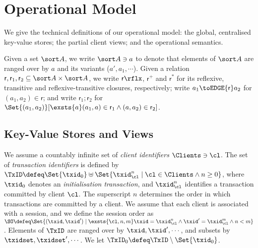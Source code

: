 \section{Operational Model}
\label{sec:model}

We give the technical definitions of our operational model: 
the global, centralised key-value stores; the partial client views;  and the
operational semantics. 

Given a set $\sort A$, we write $\sort A \ni a$ to denote that elements of $\sort A$ are ranged over by $a$ and its variants (\eg $a', a_1, \cdots$). 
Given a relation $\mathsf r, \mathsf r_1, \mathsf r_2 \subseteq \sort A \times \sort A$,
we write $\mathsf r\rflx$, $\mathsf r^+$ and $\mathsf r^*$ for its reflexive, transitive and reflexive-transitive closures, respectively;
write $a_1 \toEDGE{\mathsf r} a_2$ for $(a_1, a_2) \in \mathsf r$;
and write \( \mathsf r_1 ; \mathsf r_2\) for \( \Set{(a_1,a_2)}[\exsts{a} (a_1,a) \in \mathsf r_1 \land (a,a_2) \in \mathsf r_2]\).

\subsection{Key-Value Stores and Views}
\label{subsec:kvstores}
\label{sec:mkvs-view}
We assume a countably infinite set of \emph{client identifiers} $\Clients \ni \cl$. 
The set of \emph{transaction identifiers} is defined by
$\TxID \defeq  \Set{\txid_{0}} \uplus \Set{ \txid_{\cl}^{n} \mid \cl
  \in \Clients \land n \geq 0 }$, 
where  $\txid_0$ denotes  an \emph{initialisation transaction}, 
and $\txid_{\cl}^{n}$ identifies a transaction committed by client $\cl$. 
The superscript $n$ determines the order in which transactions 
are committed by a client. We assume that each client is associated with a session, 
and we define the session order as $\SO \defeq \Set{ (\txid, \txid') \mid \exsts{ \cl, n,m } \txid =
\txid_{\cl}^{n} \land \txid' = \txid_{\cl}^{m} \land n < m}$.
Elements of $\TxID$ are ranged over by
$\txid, \txid', \cdots$, and subsets by $\txidset, \txidset', \cdots$. 
We let $\TxID_{0} \defeq \TxID \setminus \Set{\txid_0}$. 

